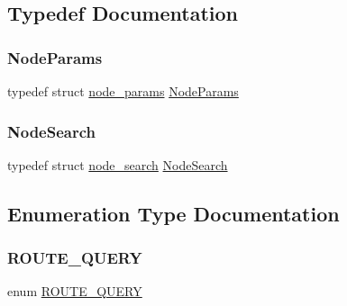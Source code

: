 \subsection{Typedef Documentation}
\mbox{\label{route-tree_8c_a3aa763b62cd1d285ed35bb7f0fe4d149}} 
\subsubsection{\texorpdfstring{Node\+Params}{NodeParams}}
{\footnotesize\ttfamily typedef struct \hyperlink{structnode__params}{node\+\_\+params}  \hyperlink{route-tree_8c_a3aa763b62cd1d285ed35bb7f0fe4d149}{Node\+Params}}

\mbox{\label{route-tree_8c_a26d9b840f9226a0ce349b00950ea0bdc}} 
\subsubsection{\texorpdfstring{Node\+Search}{NodeSearch}}
{\footnotesize\ttfamily typedef struct \hyperlink{structnode__search}{node\+\_\+search}  \hyperlink{route-tree_8c_a26d9b840f9226a0ce349b00950ea0bdc}{Node\+Search}}



\subsection{Enumeration Type Documentation}
\mbox{\label{route-tree_8c_aed8cdbb52dbe32c343a8c26887888e7f}} 
\subsubsection{\texorpdfstring{R\+O\+U\+T\+E\+\_\+\+Q\+U\+E\+RY}{ROUTE\_QUERY}}
{\footnotesize\ttfamily enum \hyperlink{route-tree_8c_aed8cdbb52dbe32c343a8c26887888e7f}{R\+O\+U\+T\+E\+\_\+\+Q\+U\+E\+RY}}

